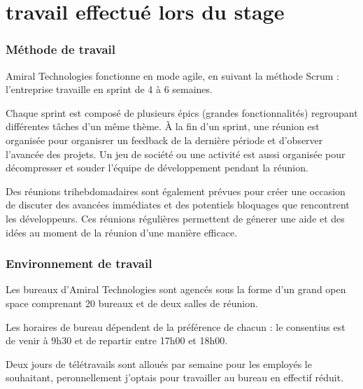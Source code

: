 \section{travail effectué lors du stage}
\subsubsection{Méthode de travail}
Amiral Technologies fonctionne en mode agile, en suivant la méthode Scrum : l’entreprise travaille en sprint de 4 à 6 semaines.

Chaque sprint est composé de plusieurs épics (grandes fonctionnalités) regroupant différentes tâches d'un même thème.
À la fin d’un sprint, une réunion est organisée pour organisrer un feedback de la dernière période et d'observer l'avancée des projets.
Un jeu de société ou une activité est aussi organisée pour décompresser et souder l'équipe de développement pendant la réunion.

Des réunions trihebdomadaires sont également prévues pour créer une occasion de discuter des avancées immédiates et des potentiels bloquages que rencontrent les développeurs.
Ces réunions régulières permettent de génerer une aide et des idées au moment de la réunion d'une manière efficace.

\subsubsection{Environnement de travail}
Les bureaux d'Amiral Technologies sont agencés sous la forme d'un grand open space comprenant 20 bureaux et de deux salles de réunion.

Les horaires de bureau dépendent de la préférence de chacun : le consentius est de venir à 9h30 et de repartir entre 17h00 et 18h00.

Deux jours de télétravails sont alloués par semaine pour les employés le souhaitant, peronnellement j'optais pour travailler au bureau en effectif réduit.